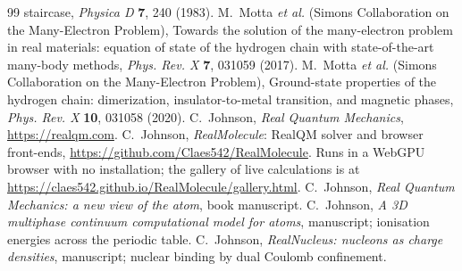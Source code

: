\documentclass[11pt]{article}
\begin{document}
\begin{thebibliography}{99}
staircase, \emph{Physica D} \textbf{7}, 240 (1983).
 M.~Motta \emph{et al.} (Simons Collaboration on the Many-Electron Problem),
Towards the solution of the many-electron problem in real materials: equation of state of the
hydrogen chain with state-of-the-art many-body methods, \emph{Phys. Rev. X} \textbf{7}, 031059
(2017).
 M.~Motta \emph{et al.} (Simons Collaboration on the Many-Electron Problem),
Ground-state properties of the hydrogen chain: dimerization, insulator-to-metal transition, and
magnetic phases, \emph{Phys. Rev. X} \textbf{10}, 031058 (2020).
 C.~Johnson, \emph{Real Quantum Mechanics}, \url{https://realqm.com}.
 C.~Johnson, \emph{RealMolecule}: RealQM solver and browser front-ends,
\url{https://github.com/Claes542/RealMolecule}. Runs in a WebGPU browser with no installation; the
gallery of live calculations is at \url{https://claes542.github.io/RealMolecule/gallery.html}.
 C.~Johnson, \emph{Real Quantum Mechanics: a new view of the atom}, book
manuscript.
 C.~Johnson, \emph{A 3D multiphase continuum computational model for atoms},
manuscript; ionisation energies across the periodic table.
 C.~Johnson, \emph{RealNucleus: nucleons as charge densities}, manuscript;
nuclear binding by dual Coulomb confinement.
\end{thebibliography}
\end{document}
